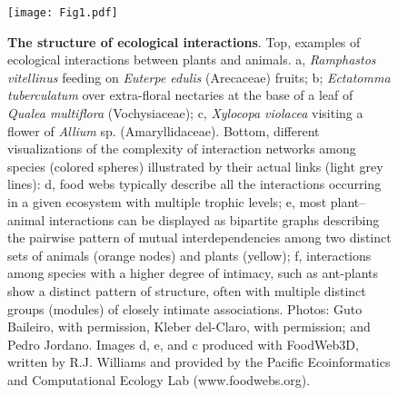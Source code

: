 \documentclass[10pt,letterpaper]{article}
\begin{document}
\begin{figure}[h]
\begin{adjustwidth}{-2.25in}{0in}
\caption{\textbf{The structure of ecological interactions}. Top, examples of ecological interactions between plants and animals. a, \textit{Ramphastos vitellinus} feeding on \textit{Euterpe edulis} (Arecaceae) fruits; b; \textit{Ectatomma tuberculatum} over extra-floral nectaries at the base of a leaf of \textit{Qualea multiflora} (Vochysiaceae); c, \textit{Xylocopa violacea} visiting a flower of \textit{Allium} sp. (Amaryllidaceae). Bottom, different visualizations of the complexity of interaction networks among species (colored spheres) illustrated by their actual links (light grey lines): d, food webs typically describe all the interactions occurring in a given ecosystem with multiple trophic levels; e, most plant–animal interactions can be displayed as bipartite graphs describing the pairwise pattern of mutual interdependencies among two distinct sets of animals (orange nodes) and plants (yellow); f, interactions among species with a higher degree of intimacy, such as ant-plants show a distinct pattern of structure, often with multiple distinct groups (modules) of closely intimate associations. Photos: Guto Baileiro, with permission, Kleber del-Claro, with permission; and Pedro Jordano. Images d, e, and c produced with FoodWeb3D, written by R.J. Williams and provided by the Pacific Ecoinformatics and Computational Ecology Lab (www.foodwebs.org).}
\label{fig1}
  \begin{center}
    \texttt{[image: Fig1.pdf]}
  \end{center}
\end{adjustwidth}
\end{figure}
\end{document}
